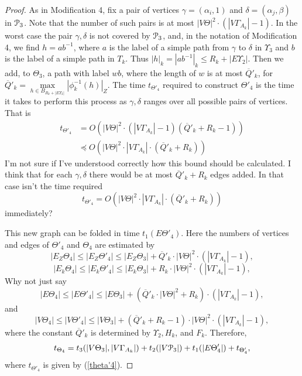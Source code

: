 \documentclass[a4paper,12pt]{article}
\renewcommand{\a}{\alpha }
\renewcommand{\b}{\beta }
\newcommand{\G}{\Gamma }
\newcommand{\g}{\gamma }
\renewcommand{\d}{\delta }
\newcommand{\T}{\Theta }
\newcommand{\U}{\Upsilon }
\newcommand{\cP}{{\cal{P}}}
\numberwithin{equation}{section}
\numberwithin{figure}{section}
\begin{document}
\begin{proof}
As in Modification 4, fix a pair of vertices 
$\g=(\a_i,1)$ and  $\d=(\a_j,\b)$ in $\cP_3$. Note that the number of such
pairs is at most $|V\T|^2 \cdot (|V \G_{A_k}|-1)$. 
In the worst case the pair $\g, \d$ is not covered by $\cP_3$, 
and, in the notation of Modification 4, 
we find $h=ab^{-1}$, where $a$ is the label of a simple path from
$\g$ to $\d$ in $\U_3$ and $b$ is the label of a simple path in $T_k$.
Thus 
$|h|_k = |ab^{-1}|_k \le R_k+ | E\U_2|$.  Then we add, to $\T_3$, a
path with label $wb$, where the length of $w$ is
 at most $\overline{Q}'_k$, for 
$\overline{Q}'_k=\max\limits_{h \in B_{R_k+|
E\U_2|}}|\phi^{-1}_k(h)|_Z$.
The time $t_{\T'_4}$ required to construct $\T'_4$ is the time
it takes to perform this process as $\g,\d$ ranges over all
possible pairs of vertices. That is 
\begin{equation}\label{theta'4}
\begin{split}
t_{\T'_4} &= O(|V\T|^2 \cdot(|V \G_{A_k}|-1)(\overline{Q}'_k+R_k -1))\\
&\preceq O(|V\T|^2 \cdot |V \G_{A_k}|\cdot(\overline{Q}'_k+R_k))
\end{split}
\end{equation}
{\ajd I'm not sure if I've understood correctly how this bound should 
be calculated. I think that for each $\g,\d$ there would be at most 
$\overline{Q}'_k+R_k$ edges added. In that case isn't the time required
\[
t_{\T'_4} =
 O(|V\T|^2 \cdot |V \G_{A_k}|\cdot(\overline{Q}'_k+R_k))
\]
immediately?
}

This new graph can be folded in time $t_1(E\T'_4)$. Here the 
numbers of vertices and edges of $\T'_4$ and $\T_4$ are estimated by
\begin{equation}\label{eztheta4}
|E_Z\T_4| \le |E_Z\T'_4| \le |E_Z\T_3|+
\overline{Q}'_k\cdot|V\T|^2 \cdot(|V \G_{A_k}|-1),
\end{equation}
\begin{equation}\label{ektheta4}
|E_k\T_4| \le |E_k\T'_4| \le  |E_k\T_3|+ R_k\cdot|V\T|^2 \cdot(|V
\G_{A_k}|-1),
\end{equation}
{\ajd Why not just say 
\[
|E\T_4| \le |E\T'_4| \le |E\T_3|+
(\overline{Q}'_k\cdot|V\T|^2 + R_k)\cdot(|V \G_{A_k}|-1),
\]
}
and
\begin{equation}\label{vtheta4}
|V\T_4| \le |V \T'_4| \le |V \T_3|
+(\overline{Q}'_k+R_k-1)\cdot|V\T|^2 \cdot(|V \G_{A_k}|-1),
\end{equation}
where the constant $\overline{Q}'_k$ is determined by $\U_2, H_k$, and
$F_k$. 
Therefore,
\begin{equation}\label{theta4}
t_{\T_4} = t_3(|V \T_3|, |V \G_{A_k}|) + t_2(|V\cP_3|)+
t_1(|E\T'_4|) + t_{\T'_4},
\end{equation}
where $t_{\T'_4}$ is given by (\ref{theta'4}).


\end{proof}
\end{document}

